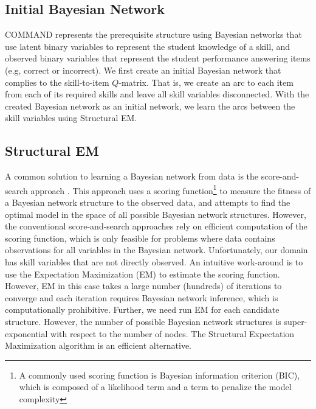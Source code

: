 \documentclass{edm_template}
\begin{document}
\subsection{Initial Bayesian Network}
\label{sec:initial_bn}
COMMAND represents the prerequisite structure using Bayesian networks that use latent binary variables to represent the student knowledge of a skill, 
and observed binary variables that represent the student performance answering items (e.g, correct or incorrect).
We first create an initial Bayesian network that complies to the skill-to-item $Q$-matrix.
That is, we create an arc to each item from each of its required skills and leave all skill variables disconnected.
With the created Bayesian network as an initial network, we learn the arcs between the skill variables using Structural EM.

\subsection{Structural EM}
\label{sec:sem}

A common solution to learning a Bayesian network from data is the score-and-search approach \cite{cooper1992bayesian,heckerman1997bayesian}.
This approach uses a scoring function\footnote{A commonly used scoring function is Bayesian information criterion (BIC), which is composed of a likelihood term and a term to penalize the model complexity} to measure the fitness of a Bayesian network structure to the observed data, 
and attempts to find the optimal model in the space of all possible Bayesian network structures.
However, the conventional score-and-search approaches rely on efficient computation of the scoring function, 
which is only feasible for problems where data contains observations for all variables in the Bayesian network.
Unfortunately, our domain has skill variables that are not directly observed.
An intuitive work-around is to use the Expectation Maximization (EM) to estimate the scoring function.
However, EM in this case takes a large number (hundreds) of iterations to converge and each iteration requires Bayesian network inference, 
which is computationally prohibitive.
Further, we need run EM for each candidate structure. However, the number of possible Bayesian network structures is super-exponential with respect to the number of nodes.
The Structural Expectation Maximization algorithm \cite{friedman1997learning} is an efficient alternative.
\end{document}
